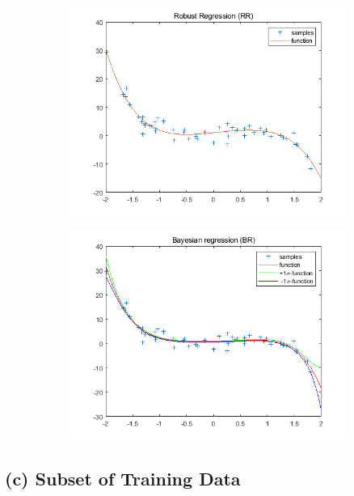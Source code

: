 \documentclass{article}
\begin{document}
\begin{figure}
\begin{subfigure}[b]{0.475\textwidth}
        \includegraphics[width=\textwidth]{fig/1b-rr.png} 
    \end{subfigure}
    \quad
    \begin{subfigure}[b]{0.475\textwidth}   
        \centering 
        \includegraphics[width=\textwidth]{fig/1b-br.png} 
    \end{subfigure}
\end{figure}

\subsection*{(c) Subset of Training Data}
\end{document}
